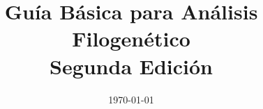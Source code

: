 \usepackage [english,spanish,activeacute]{babel}
\usepackage[utf8x]{inputenc}
% 
\usepackage{pstricks,pst-node,pst-tree}
\usepackage{tikz}
\usepackage{amsmath}
\usepackage{amsfonts}
\usepackage{amssymb,latexsym}
\usepackage[Sonny]{fncychap}
\usepackage{fancyhdr}
\usepackage{enumitem}


\usepackage{makeidx}
\makeindex
\pagestyle{fancy}

\usepackage[right=2.5cm,left=2.5cm,top=3.5cm,bottom=3.0cm,headsep=1cm,footskip=1.0cm]{geometry}



%
\hypersetup{%
%
      pdfcreator=Rafael Miranda-Esquivel,%
%
   }

\renewcommand{\baselinestretch}{0.75}

\usepackage{setspace}

\doublespacing{}

\setlength{\parindent}{0pt}



\large
\title{Gu\'ia B\'asica para An\'alisis Filogen\'etico\\Segunda Edici\'on}

% 

\date{\today}

